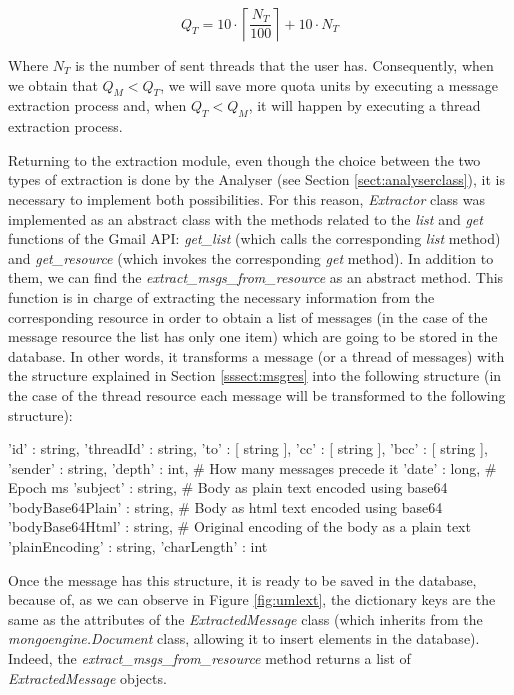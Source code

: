 $$
Q_T = 10\cdot\left\lceil\frac{N_T}{100}\right\rceil+10\cdot N_T
$$

Where $N_T$ is the number of sent threads that the user has. Consequently, when we obtain that $Q_M < Q_T$, we will save more quota units by executing a message extraction process and, when $Q_T < Q_M$, it will happen by executing a thread extraction process.

Returning to the extraction module, even though the choice between the two types of extraction is done by the Analyser (see Section \ref{sect:analyserclass}), it is necessary to implement both possibilities. For this reason, \textit{Extractor} class was implemented as an abstract class with the methods related to the \textit{list} and \textit{get} functions of the Gmail API: \textit{get\_list} (which calls the corresponding \textit{list} method) and \textit{get\_resource} (which invokes the corresponding \textit{get} method). In addition to them, we can find the \textit{extract\_msgs\_from\_resource} as an abstract method. This function is in charge of extracting the necessary information from the corresponding resource in order to obtain a list of messages (in the case of the message resource the list has only one item) which are going to be stored in the database. In other words, it transforms a message (or a thread of messages) with the structure explained in Section \ref{sssect:msgres} into the following structure (in the case of the thread resource each message will be transformed to the following structure):

\begin{python}
{
	'id' : string,
	'threadId' : string,
	'to' : [ string ],
	'cc' : [ string ],
	'bcc' : [ string ],
	'sender' : string,
	'depth' : int,               # How many messages precede it
	'date' : long,               # Epoch ms
	'subject' : string,
	# Body as plain text encoded using base64
	'bodyBase64Plain' : string,
	# Body as html text encoded using base64
	'bodyBase64Html' : string,
	# Original encoding of the body as a plain text
	'plainEncoding' : string,    
	'charLength' : int
}
\end{python}

Once the message has this structure, it is ready to be saved in the database, because of, as we can observe in Figure \ref{fig:umlext}, the dictionary keys are the same as the attributes of the \textit{ExtractedMessage} class (which inherits from the \textit{mongoengine.Document} class, allowing it to insert elements in the database). Indeed, the \textit{extract\_msgs\_from\_resource} method returns a list of \textit{ExtractedMessage} objects.

